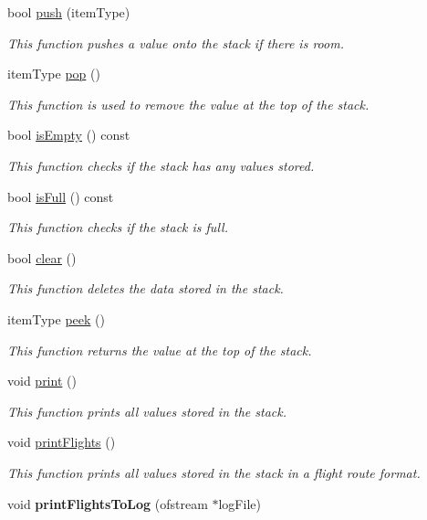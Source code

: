 \begin{DoxyCompactItemize}
\item 
bool \hyperlink{class_stack_a4818af0b239152e47fc58affd835af07}{push} (item\+Type)
\begin{DoxyCompactList}\small\item\em This function pushes a value onto the stack if there is room. \end{DoxyCompactList}\item 
item\+Type \hyperlink{class_stack_a338004c15b0e8a946503edf7de7b1f6c}{pop} ()
\begin{DoxyCompactList}\small\item\em This function is used to remove the value at the top of the stack. \end{DoxyCompactList}\item 
bool \hyperlink{class_stack_a6fe8b8562bd7a9b944645f18b3756a83}{is\+Empty} () const 
\begin{DoxyCompactList}\small\item\em This function checks if the stack has any values stored. \end{DoxyCompactList}\item 
bool \hyperlink{class_stack_a481f030244ba8c14d0560efd9d5b9a9c}{is\+Full} () const 
\begin{DoxyCompactList}\small\item\em This function checks if the stack is full. \end{DoxyCompactList}\item 
bool \hyperlink{class_stack_a5d88a4afe5eafd2eb64af4ae11c0a3d4}{clear} ()
\begin{DoxyCompactList}\small\item\em This function deletes the data stored in the stack. \end{DoxyCompactList}\item 
item\+Type \hyperlink{class_stack_a3832797c0ce020f1564dd28b4a4ab43e}{peek} ()
\begin{DoxyCompactList}\small\item\em This function returns the value at the top of the stack. \end{DoxyCompactList}\item 
void \hyperlink{class_stack_accff4918f3c313e2b5217fbb54602f6c}{print} ()
\begin{DoxyCompactList}\small\item\em This function prints all values stored in the stack. \end{DoxyCompactList}\item 
void \hyperlink{class_stack_ab3e450bb26a2ddc4158f21d2ae57267f}{print\+Flights} ()
\begin{DoxyCompactList}\small\item\em This function prints all values stored in the stack in a flight route format. \end{DoxyCompactList}\item 
void {\bfseries print\+Flights\+To\+Log} (ofstream $\ast$log\+File)\hypertarget{class_stack_af330d4a34d33b93fc2413c0736fa52b1}{}\label{class_stack_af330d4a34d33b93fc2413c0736fa52b1}

\end{DoxyCompactItemize}
